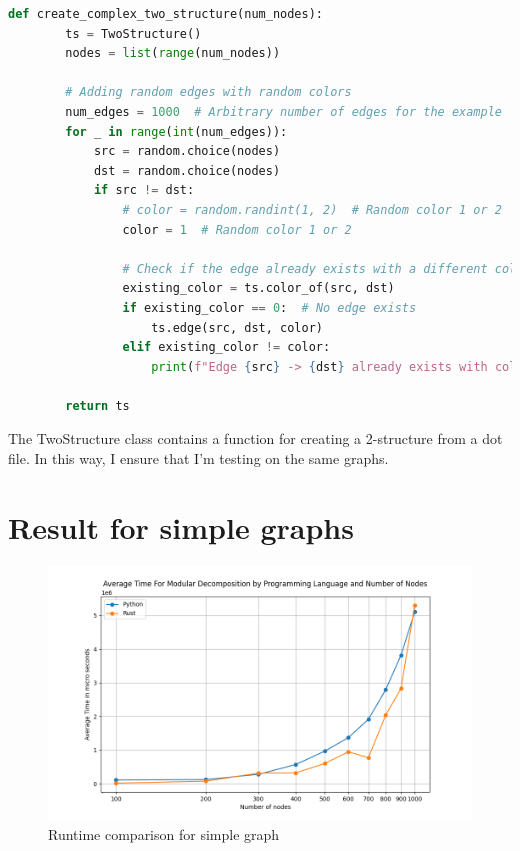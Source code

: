 \begin{lstlisting}[language=Python, style=python, caption={Graph complex generation function}, label={lst:graph-complex-generation-function}, firstnumber=1]
    def create_complex_two_structure(num_nodes):
        ts = TwoStructure()
        nodes = list(range(num_nodes))

        # Adding random edges with random colors
        num_edges = 1000  # Arbitrary number of edges for the example
        for _ in range(int(num_edges)):
            src = random.choice(nodes)
            dst = random.choice(nodes)
            if src != dst:
                # color = random.randint(1, 2)  # Random color 1 or 2
                color = 1  # Random color 1 or 2

                # Check if the edge already exists with a different color
                existing_color = ts.color_of(src, dst)
                if existing_color == 0:  # No edge exists
                    ts.edge(src, dst, color)
                elif existing_color != color:
                    print(f"Edge {src} -> {dst} already exists with color {existing_color}, skipping...")

        return ts
\end{lstlisting}

The TwoStructure class contains a function for creating a 2-structure from a dot file.
In this way, I ensure that I'm testing on the same graphs.


\section{Result for simple graphs}\label{sec:result-for-simple-graphs}

\begin{figure}[!h]
    \centering
    \includegraphics[width=1\textwidth]{images/stats/md_simple}
    \caption{Runtime comparison for simple graph}
    \label{fig:runtime-comparison-for-simple-graph}
\end{figure}


